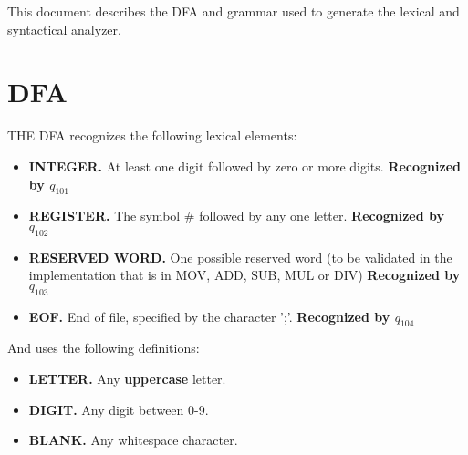 \documentclass[]{article}
\begin{document}
    \setlength{\headheight}{23.10004pt}
    \addtolength{\topmargin}{-11.10004pt}    

    \noindent
    This document describes the DFA and grammar used to generate the lexical and syntactical analyzer. 
    
    \section{DFA}
    THE DFA recognizes the following lexical elements:

    \begin{itemize}
        \item[] \textbf{INTEGER.} At least one digit followed by zero or more digits. \textbf{Recognized by $q_{101}$}
        \item[] \textbf{REGISTER.} The symbol \# followed by any one letter. \textbf{Recognized by $q_{102}$}
        \item[] \textbf{RESERVED WORD.} One possible reserved word (to be validated in the implementation that is in MOV, ADD, SUB, MUL or DIV) \textbf{Recognized by $q_{103}$}
        \item[] \textbf{EOF.} End of file, specified by the character ';'. \textbf{Recognized by $q_{104}$}
    \end{itemize}
    
    \noindent
    And uses the following definitions:
    \begin{itemize}
        \item[] \textbf{LETTER.} Any \textbf{uppercase} letter.
        \item[] \textbf{DIGIT.} Any digit between 0-9.
        \item[] \textbf{BLANK.} Any whitespace character.
    \end{itemize}

    \begin{center}
    \end{center}
\end{document}
